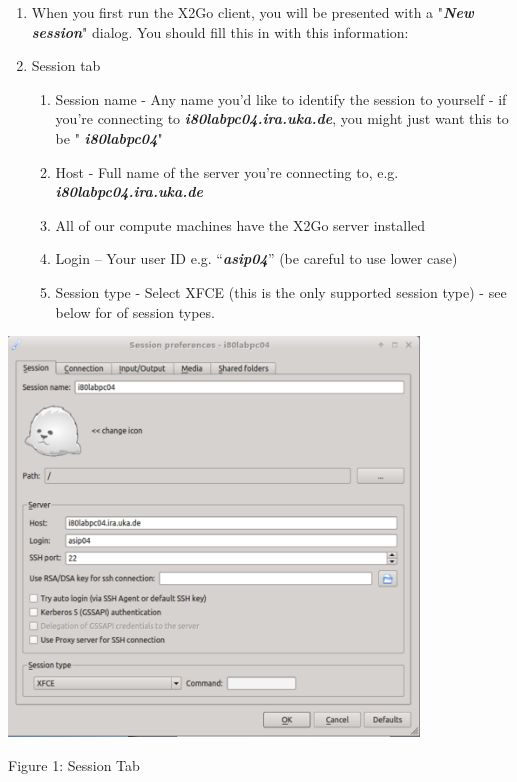 \documentclass{article}
\begin{document}
\begin{enumerate}
\def\labelenumi{\arabic{enumi}.}
\setcounter{enumi}{3}
\item
  When you first run the X2Go client, you will be presented with a
  "\emph{\textbf{New session}}" dialog. You should fill this in with
  this information:
\item
  Session tab

  \begin{enumerate}
  \def\labelenumii{\arabic{enumii}.}
  \item
    Session name - Any name you'd like to identify the session to
    yourself - if you're connecting to
    \emph{\textbf{i80labpc04.ira.uka.de}}, you might just want this to
    be " \emph{\textbf{i80labpc04}}"
  \item
    Host - Full name of the server you're connecting to, e.g.
    \emph{\textbf{i80labpc04.ira.uka.de}}
  \item
    All of our compute machines have the X2Go server installed
  \item
    Login -- Your user ID e.g. ``\emph{\textbf{asip04}}'' (be careful to
    use lower case)
  \item
    Session type - Select XFCE (this is the only supported session type)
    - see below for of session types.
  \end{enumerate}
\end{enumerate}

\includegraphics[width=4.28968in,height=4.17836in]{images/media/image1.png}

Figure 1: Session Tab
\end{document}
